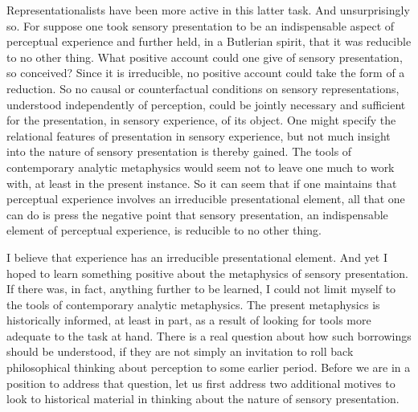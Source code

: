 Representationalists have been more active in this latter task. And unsurprisingly so. For suppose one took sensory presentation to be an indispensable aspect of perceptual experience and further held, in a Butlerian spirit, that it was reducible to no other thing. What positive account could one give of sensory presentation, so conceived? Since it is irreducible, no positive account could take the form of a reduction. So no causal or counterfactual conditions on sensory representations, understood independently of perception, could be jointly necessary and sufficient for the presentation, in sensory experience, of its object. One might specify the relational features of presentation in sensory experience, but not much insight into the nature of sensory presentation is thereby gained. The tools of contemporary analytic metaphysics would seem not to leave one much to work with, at least in the present instance. So it can seem that if one maintains that perceptual experience involves an irreducible presentational element, all that one can do is press the negative point that sensory presentation, an indispensable element of perceptual experience, is reducible to no other thing.

I believe that experience has an irreducible presentational element. And yet I hoped to learn something positive about the metaphysics of sensory presentation. If there was, in fact, anything further to be learned, I could not limit myself to the tools of contemporary analytic metaphysics. The present metaphysics is historically informed, at least in part, as a result of looking for tools more adequate to the task at hand. There is a real question about how such borrowings should be understood, if they are not simply an invitation to roll back philosophical thinking about perception to some earlier period. Before we are in a position to address that question, let us first address two additional motives to look to historical material in thinking about the nature of sensory presentation.

